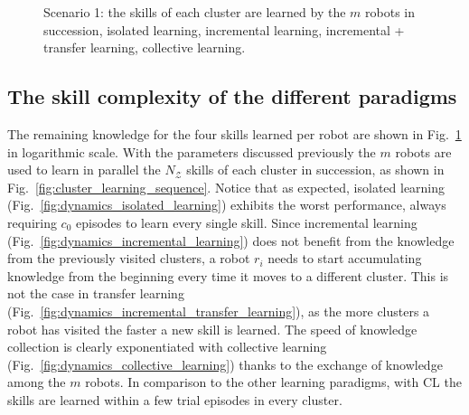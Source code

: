 \begin{figure}[!t]
	\hspace*{\fill}
	\caption[] {\label{fig:collective_learning} Scenario 1:  the skills of each cluster are learned by the $ m$ robots in succession,  isolated learning,   incremental learning,   incremental + transfer learning,  collective learning.}
\end{figure}

\subsection{The skill complexity of the different paradigms}
The remaining knowledge for the four skills learned per robot are shown in Fig.~\ref{fig:collective_learning} in logarithmic scale. With the parameters discussed previously the $m$ robots are used to learn in parallel the $N_\mathcal{Z}$ skills of each cluster in succession, as shown in Fig.~\ref{fig:cluster_learning_sequence}. Notice that as expected, isolated learning (Fig.~\ref{fig:dynamics_isolated_learning}) exhibits the worst performance, always requiring $c_0$ episodes to learn every single skill. Since incremental learning (Fig.~\ref{fig:dynamics_incremental_learning}) does not benefit from the knowledge from the previously visited clusters, a robot $r_i$ needs to start accumulating knowledge from the beginning every time it moves to a different cluster. This is not the case in transfer learning (Fig.~\ref{fig:dynamics_incremental_transfer_learning}), as the more clusters a robot has visited the faster a new skill is learned. The speed of knowledge collection is clearly exponentiated with collective learning (Fig.~\ref{fig:dynamics_collective_learning}) thanks to the exchange of knowledge among the $m$ robots. In comparison to the other learning paradigms, with CL the skills are learned within a few trial episodes in every cluster. 

